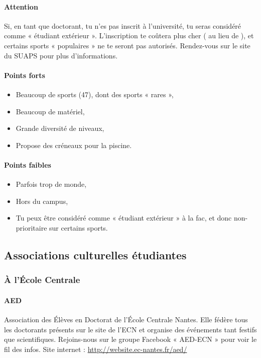\paragraph{Attention} Si, en tant que doctorant, tu n'es pas inscrit à l'université, tu seras considéré comme « étudiant extérieur ».
L'inscription te coûtera plus cher ( au lieu de ), et certains sports « populaires » ne te seront pas autorisés.
Rendez-vous sur le site du SUAPS pour plus d'informations.

\paragraph{Points forts}
\begin{itemize}
  \item Beaucoup de sports (47), dont des sports « rares »,
  \item Beaucoup de matériel,
  \item Grande diversité de niveaux,
  \item Propose des créneaux pour la piscine.
\end{itemize}
\paragraph{Points faibles}
\begin{itemize}
  \item Parfois trop de monde,
  \item Hors du campus,
  \item Tu peux être considéré comme « étudiant extérieur » à la fac, et donc non-prioritaire sur certains sports.
\end{itemize}

\subsection{Associations culturelles étudiantes}\trad
\subsubsection{À l'École Centrale}
\paragraph{AED} Association des Élèves en Doctorat de l'École Centrale Nantes. Elle fédère tous les doctorants présents sur le site de l'ECN et organise des événements tant festifs que scientifiques. Rejoins-nous sur le groupe Facebook « AED-ECN » pour voir le fil des infos. Site internet : \url{http://website.ec-nantes.fr/aed/}
